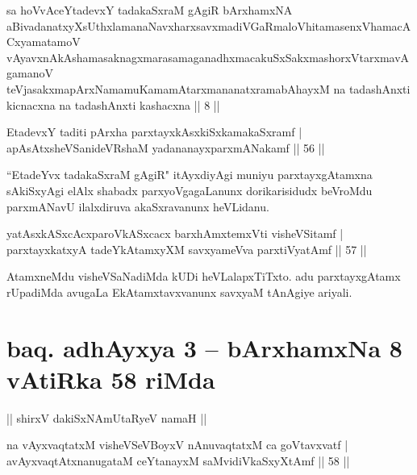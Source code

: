 
\begin{kandikeshl}
sa hoVvAceYtadevxY tadakaSxraM gAgiR bArxhamxNA aBivadanatxyXsUthxlamanaNavxharxsavxmadiVGaRmaloVhitamasenxVhamacACxyamatamoV\s \\ vAyavxnAkAshamasaknagxmarasamaganadhxmacakuSxSakxmashorxVtarxmavAgamanoV\s\\ teVjasakxmapArxNamamuKamamAtarxmananatxramabAhayxM na tadashAnxti kicnacxna na tadashAnxti kashacxna || 8 ||
\end{kandikeshl}

\begin{shl}
EtadevxY taditi pArxha parxtayxkAsxkiSxkamakaSxramf |\\
apAsAtxsheVSanideVRshaM yadananayxparxmANakamf \hfill || 56 ||
\end{shl}

\begin{artha}
``EtadeYvx tadakaSxraM gAgiR" itAyxdiyAgi muniyu parxtayxgAtamxna sAkiSxyAgi elAlx shabadx parxyoVgagaLanunx dorikarisidudx beVroMdu parxmANavU ilalxdiruva akaSxravanunx heVLidanu.
\end{artha}

\begin{shl}
yatAsxkASxcAcxparoVkASxcacx barxhAmxtemxVti visheVSitamf |\\
parxtayxkatxyA tadeYkAtamxyXM savxyameVva parxtiVyatAmf \hfill || 57 ||
\end{shl}

\begin{artha}
AtamxneMdu visheVSaNadiMda kUDi heVLalapxTiTxto. adu parxtayxgAtamx rUpadiMda avugaLa EkAtamxtavxvanunx savxyaM tAnAgiye ariyali.
\end{artha}%

\section*{baq. adhAyxya 3 -- bArxhamxNa 8 vAtiRka 58 riMda}

\begin{center}%
|| shirxV dakiSxNAmUtaRyeV namaH ||
\end{center}

\begin{shl}
na vAyxvaqtatxM visheVSeVBoyxV nAnuvaqtatxM ca goVtavxvatf |\\
avAyxvaqtAtxnanugataM ceYtanayxM saMvidiVkaSxyXtAmf \hfill || 58 ||
\end{shl}

